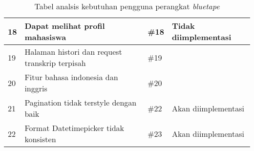 \begin{table}[H]
{\begin{tabular}{|l|l|l|l|}
	18 & Dapat melihat profil mahasiswa & \#18 & Tidak diimplementasi\\ \hline
	19 & Halaman histori dan request transkrip terpisah & \#19 & \\ \hline
	20 & Fitur bahasa indonesia dan inggris & \#20 & \\ \hline
	21 & Pagination tidak terstyle dengan baik & \#22 & Akan diimplementasi\\ \hline
	22 & Format Datetimepicker tidak konsisten &\#23 & Akan diimplementasi\\ \hline
	
	
	\end{tabular}}
	\caption{Tabel analsis kebutuhan pengguna perangkat \textit{bluetape}}
\end{table}